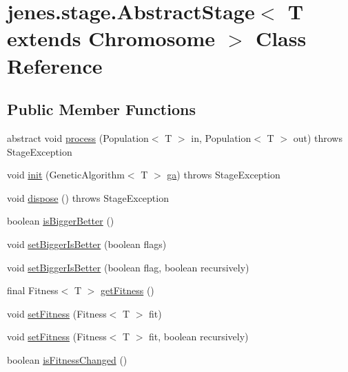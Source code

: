 \hypertarget{classjenes_1_1stage_1_1_abstract_stage_3_01_t_01extends_01_chromosome_01_4}{\section{jenes.\-stage.\-Abstract\-Stage$<$ T extends Chromosome $>$ Class Reference}
\label{classjenes_1_1stage_1_1_abstract_stage_3_01_t_01extends_01_chromosome_01_4}
}
\subsection*{Public Member Functions}
\begin{DoxyCompactItemize}
\item 
abstract void \hyperlink{classjenes_1_1stage_1_1_abstract_stage_3_01_t_01extends_01_chromosome_01_4_a1e8398b28d820dc0e7343b15ce19c703}{process} (Population$<$ T $>$ in, Population$<$ T $>$ out)  throws Stage\-Exception
\item 
void \hyperlink{classjenes_1_1stage_1_1_abstract_stage_3_01_t_01extends_01_chromosome_01_4_af16b278b3f7a6d9fd78e742621b956e5}{init} (Genetic\-Algorithm$<$ T $>$ \hyperlink{classjenes_1_1stage_1_1_abstract_stage_3_01_t_01extends_01_chromosome_01_4_a751aba4f46b29d22592d48422ffa75f9}{ga})  throws Stage\-Exception 
\item 
void \hyperlink{classjenes_1_1stage_1_1_abstract_stage_3_01_t_01extends_01_chromosome_01_4_a68d4104c004b50abf7b12ffc94122ddc}{dispose} ()  throws Stage\-Exception 
\item 
boolean \hyperlink{classjenes_1_1stage_1_1_abstract_stage_3_01_t_01extends_01_chromosome_01_4_ac20363682ebc9214d9253ff157a06a2d}{is\-Bigger\-Better} ()
\item 
void \hyperlink{classjenes_1_1stage_1_1_abstract_stage_3_01_t_01extends_01_chromosome_01_4_adfddd6664c7f9f2eeba94d59de6fcebf}{set\-Bigger\-Is\-Better} (boolean flags)
\item 
void \hyperlink{classjenes_1_1stage_1_1_abstract_stage_3_01_t_01extends_01_chromosome_01_4_a003250025de6f005e247a05b107e5e8f}{set\-Bigger\-Is\-Better} (boolean flag, boolean recursively)
\item 
final Fitness$<$ T $>$ \hyperlink{classjenes_1_1stage_1_1_abstract_stage_3_01_t_01extends_01_chromosome_01_4_a9de5f0a09b7791fe1e93123ada1c434a}{get\-Fitness} ()
\item 
void \hyperlink{classjenes_1_1stage_1_1_abstract_stage_3_01_t_01extends_01_chromosome_01_4_ad60267d0a803c2991ac3ef02ababef2b}{set\-Fitness} (Fitness$<$ T $>$ fit)
\item 
void \hyperlink{classjenes_1_1stage_1_1_abstract_stage_3_01_t_01extends_01_chromosome_01_4_aff1c8307dc89c4fcf7f253b50a87464d}{set\-Fitness} (Fitness$<$ T $>$ fit, boolean recursively)
\item 
boolean \hyperlink{classjenes_1_1stage_1_1_abstract_stage_3_01_t_01extends_01_chromosome_01_4_a811a041cd505ad8400b3c8b2aa36f4a9}{is\-Fitness\-Changed} ()
\end{DoxyCompactItemize}

